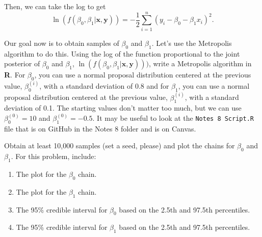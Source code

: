 \documentclass[
]{article}
\providecommand{\tightlist}{%
  \setlength{\itemsep}{0pt}\setlength{\parskip}{0pt}}
\begin{document}
Then, we can take the log to get \[
\ln(f(\beta_0,\beta_1|\boldsymbol{x},\boldsymbol{y}))=-\frac{1}{2}\sum_{i=1}^n(y_i-\beta_0-\beta_1x_i)^2.
\]

Our goal now is to obtain samples of \(\beta_0\) and \(\beta_1\). Let's
use the Metropolis algorithm to do this. Using the log of the function
proportional to the joint posterior of \(\beta_0\) and \(\beta_1\),
\(\ln(f(\beta_0,\beta_1|\boldsymbol{x},\boldsymbol{y})))\), write a
Metropolis algorithm in \textbf{R}. For \(\beta_0\), you can use a
normal proposal distribution centered at the previous value,
\(\beta_0^{(i)}\), with a standard deviation of 0.8 and for \(\beta_1\),
you can use a normal proposal distribution centered at the previous
value, \(\beta_1^{(i)}\), with a standard deviation of 0.1. The starting
values don't matter too much, but we can use \(\beta_0^{(0)}=10\) and
\(\beta_1^{(0)}=-0.5\). It may be useful to look at the
\texttt{Notes\ 8\ Script.R} file that is on GitHub in the Notes 8 folder
and is on Canvas.

Obtain at least 10,000 samples (set a seed, please) and plot the chains
for \(\beta_0\) and \(\beta_1\). For this problem, include:

\begin{enumerate}
\def\labelenumi{\arabic{enumi}.}
\tightlist
\item
  The plot for the \(\beta_0\) chain.
\item
  The plot for the \(\beta_1\) chain.
\item
  The 95\% credible interval for \(\beta_0\) based on the 2.5th and
  97.5th percentiles.
\item
  The 95\% credible interval for \(\beta_1\) based on the 2.5th and
  97.5th percentiles.
\end{enumerate}
\end{document}
